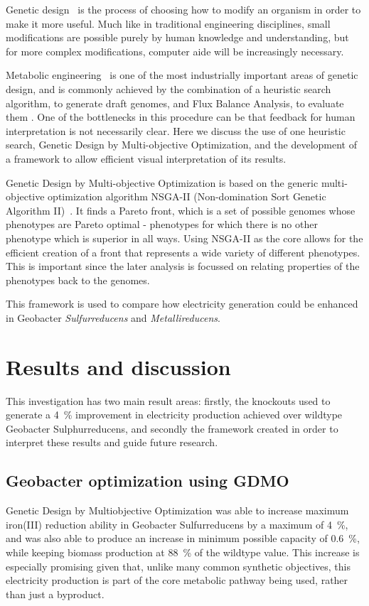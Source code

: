 \documentclass[a4paper,twocolumn]{article}
\begin{document}
Genetic design~\cite{} is the process of choosing how to modify an organism in order to make it more useful. Much like in traditional engineering disciplines, small modifications are possible purely by human knowledge and understanding, but for more complex modifications, computer aide will be increasingly necessary.

Metabolic engineering~\cite{} is one of the most industrially important areas of genetic design, and is commonly achieved by the combination of a heuristic search algorithm, to generate draft genomes, and Flux Balance Analysis, to evaluate them \cite{}. One of the bottlenecks in this procedure can be that feedback for human interpretation is not necessarily clear. Here we discuss the use of one heuristic search, Genetic Design by Multi-objective Optimization\cite{}, and the development of a framework to allow efficient visual interpretation of its results.

Genetic Design by Multi-objective Optimization is based on the generic multi-objective optimization algorithm NSGA-II (Non-domination Sort Genetic Algorithm II)~\cite{}. It finds a Pareto front, which is a set of possible genomes whose phenotypes are Pareto optimal - phenotypes for which there is no other phenotype which is superior in all ways. Using NSGA-II as the core allows for the efficient creation of a front that represents a wide variety of different phenotypes. This is important since the later analysis is focussed on relating properties of the phenotypes back to the genomes.

This framework is used to compare how electricity generation could be enhanced in Geobacter \emph{Sulfurreducens} and \emph{Metallireducens}.

\section{Results and discussion}

This investigation has two main result areas: firstly, the knockouts used to generate a \SI{4}{\percent} improvement in electricity production achieved over wildtype Geobacter Sulphurreducens, and secondly the framework created in order to interpret these results and guide future research.

\subsection{Geobacter optimization using GDMO}
Genetic Design by Multiobjective Optimization was able to increase maximum iron(III) reduction ability in Geobacter Sulfurreducens by a maximum of  \SI{4}{\percent}, and was also able to produce an increase in minimum possible capacity of  \SI{0.6}{\percent}, while keeping biomass production at  \SI{88}{\percent} of the wildtype value. This increase is especially promising given that, unlike many common synthetic objectives, this electricity production is part of the core metabolic pathway being used, rather than just a byproduct. 
\end{document}
